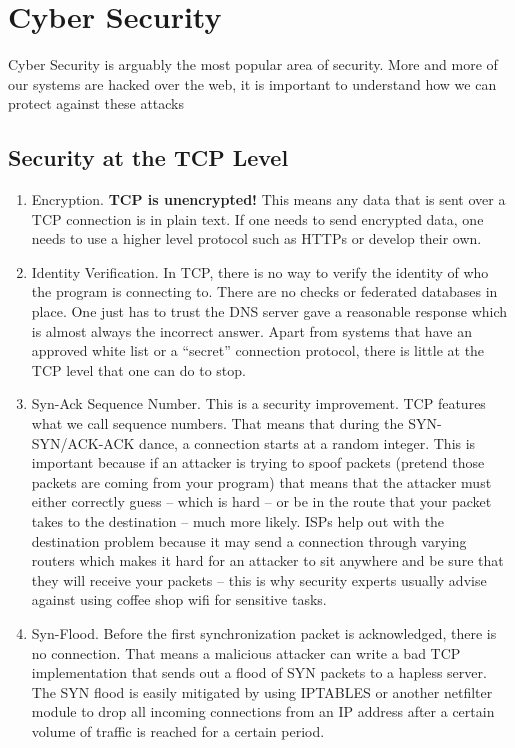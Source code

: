 \section{Cyber Security}

Cyber Security is arguably the most popular area of security.
More and more of our systems are hacked over the web, it is important to understand how we can protect against these attacks

\subsection{Security at the TCP Level}

\begin{enumerate}
\item Encryption.
  \textbf{TCP is unencrypted!} This means any data that is sent over a TCP connection is in plain text.
  If one needs to send encrypted data, one needs to use a higher level protocol such as HTTPs or develop their own.
\item Identity Verification.
  In TCP, there is no way to verify the identity of who the program is connecting to.
  There are no checks or federated databases in place.
  One just has to trust the DNS server gave a reasonable response which is almost always the incorrect answer.
  Apart from systems that have an approved white list or a ``secret'' connection protocol, there is little at the TCP level that one can do to stop.
\item Syn-Ack Sequence Number.
  This is a security improvement.
  TCP features what we call sequence numbers.
  That means that during the SYN-SYN/ACK-ACK dance, a connection starts at a random integer.
  This is important because if an attacker is trying to spoof packets (pretend those packets are coming from your program) that means that the attacker must either correctly guess -- which is hard -- or be in the route that your packet takes to the destination -- much more likely.
  ISPs help out with the destination problem because it may send a connection through varying routers which makes it hard for an attacker to sit anywhere and be sure that they will receive your packets -- this is why security experts usually advise against using coffee shop wifi for sensitive tasks.
\item Syn-Flood.
  Before the first synchronization packet is acknowledged, there is no connection.
  That means a malicious attacker can write a bad TCP implementation that sends out a flood of SYN packets to a hapless server.
  The SYN flood is easily mitigated by using IPTABLES or another netfilter module to drop all incoming connections from an IP address after a certain volume of traffic is reached for a certain period.

\end{enumerate}
